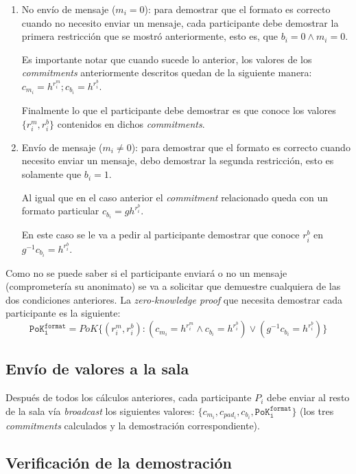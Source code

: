\begin{enumerate}
    \item No envío de mensaje ($m_i = 0$): para demostrar que el formato es correcto 
    cuando no necesito enviar un mensaje, cada participante debe demostrar la primera 
    restricción que se mostró anteriormente, esto es, que $b_i = 0 \land m_i = 0$.
    
    Es importante notar que cuando sucede lo anterior, los valores de los 
    \emph{commitments} anteriormente descritos quedan de la siguiente manera: 
    $c_{m_i} = h^{r_i^m}; c_{b_i} = h^{r_i^b}$.
    
    Finalmente lo que el participante debe demostrar es que conoce los valores 
    $\{r_i^m, r_i^b\}$ contenidos en dichos \emph{commitments}.
    \item Envío de mensaje ($m_i \neq 0$): para demostrar que el formato es 
    correcto cuando necesito enviar un mensaje, debo demostrar la segunda 
    restricción, esto es solamente que $b_i = 1$.
    
    Al igual que en el caso anterior el \emph{commitment} relacionado queda con 
    un formato particular $c_{b_i} = g h^{r_i^b}$.
    
    En este caso se le va a pedir al participante demostrar que conoce $r_i^b$ 
    en $g^{-1} c_{b_i} = h^{r_i^b}$.
\end{enumerate}

Como no se puede saber si el participante enviará o no un mensaje 
(comprometería su anonimato) se va a solicitar que demuestre cualquiera de las 
dos condiciones anteriores. La \emph{zero-knowledge proof} que necesita demostrar 
cada participante es la siguiente: 
$$\mathtt{PoK_i^{format}} = PoK\{(r_i^m, r_i^b) : (c_{m_i} = h^{r_i^m} \land c_{b_i} = h^{r_i^b}) \lor (g^{-1} c_{b_i} = h^{r_i^b})\}$$

\subsection{Envío de valores a la sala}

Después de todos los cálculos anteriores, cada participante $P_i$ debe enviar 
al resto de la sala vía \emph{broadcast} los siguientes valores: 
$\{c_{m_i}, c_{pad_i}, c_{b_i}, \mathtt{PoK_i^{format}}\}$ (los tres \emph{commitments} 
calculados y la demostración correspondiente).

\subsection{Verificación de la demostración}

